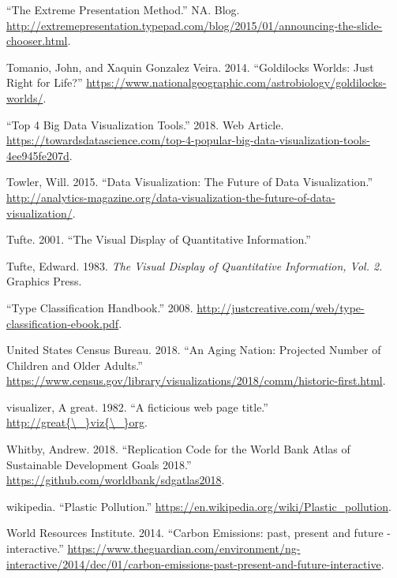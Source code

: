 \documentclass[]{book}
\theoremstyle{definition}
\theoremstyle{definition}
\theoremstyle{definition}
\theoremstyle{remark}
\begin{document}
\hypertarget{ref-extremepre}{}
``The Extreme Presentation Method.'' NA. Blog.
\url{http://extremepresentation.typepad.com/blog/2015/01/announcing-the-slide-chooser.html}.

\hypertarget{ref-goldilocks_worlds}{}
Tomanio, John, and Xaquin Gonzalez Veira. 2014. ``Goldilocks Worlds:
Just Right for Life?''
\url{https://www.nationalgeographic.com/astrobiology/goldilocks-worlds/}.

\hypertarget{ref-top4_viz_tools}{}
``Top 4 Big Data Visualization Tools.'' 2018. Web Article.
\url{https://towardsdatascience.com/top-4-popular-big-data-visualization-tools-4ee945fe207d}.

\hypertarget{ref-future_viz}{}
Towler, Will. 2015. ``Data Visualization: The Future of Data
Visualization.''
\url{http://analytics-magazine.org/data-visualization-the-future-of-data-visualization/}.

\hypertarget{ref-Tufte_2001}{}
Tufte. 2001. ``The Visual Display of Quantitative Information.''

\hypertarget{ref-visual_display}{}
Tufte, Edward. 1983. \emph{The Visual Display of Quantitative
Information, Vol. 2.} Graphics Press.

\hypertarget{ref-type_class}{}
``Type Classification Handbook.'' 2008.
\url{http://justcreative.com/web/type-classification-ebook.pdf}.

\hypertarget{ref-aging_nation}{}
United States Census Bureau. 2018. ``An Aging Nation: Projected Number
of Children and Older Adults.''
\url{https://www.census.gov/library/visualizations/2018/comm/historic-first.html}.

\hypertarget{ref-great_viz}{}
visualizer, A great. 1982. ``A ficticious web page title.''
\href{http://great\%7B/_\%7Dviz\%7B/_\%7Dorg}{http://great\{\textbackslash{}\_\}viz\{\textbackslash{}\_\}org}.

\hypertarget{ref-worldbankcode}{}
Whitby, Andrew. 2018. ``Replication Code for the World Bank Atlas of
Sustainable Development Goals 2018.''
\url{https://github.com/worldbank/sdgatlas2018}.

\hypertarget{ref-wiki_plastic_pollution}{}
wikipedia. ``Plastic Pollution.''
\url{https://en.wikipedia.org/wiki/Plastic_pollution}.

\hypertarget{ref-CO2_emission}{}
World Resources Institute. 2014. ``Carbon Emissions: past, present and
future - interactive.''
\url{https://www.theguardian.com/environment/ng-interactive/2014/dec/01/carbon-emissions-past-present-and-future-interactive}.
\end{document}
